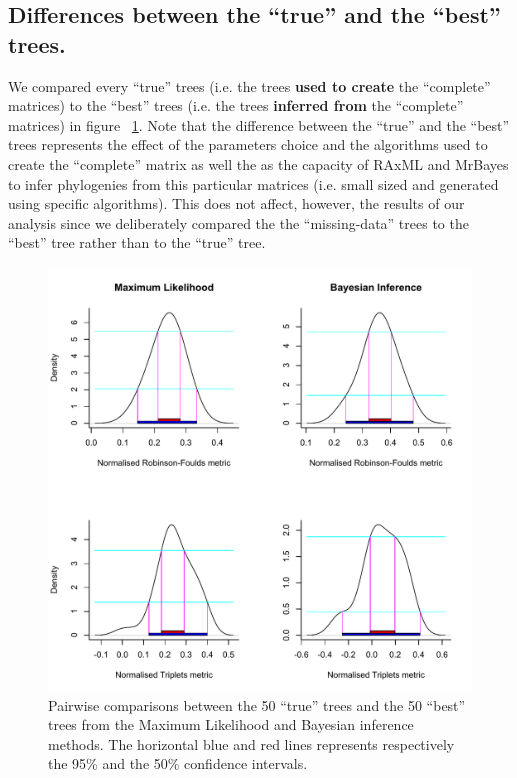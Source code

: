 \documentclass[12pt,letterpaper]{article}
\begin{document}
\subsection{Differences between the ``true'' and the ``best'' trees.}
We compared every ``true'' trees (i.e. the trees \textbf{used to create} the ``complete'' matrices) to the ``best'' trees (i.e. the trees \textbf{inferred from} the ``complete'' matrices) in figure ~\ref{Fig_Supp_True_Best}.
Note that the difference between the ``true'' and the ``best'' trees represents the effect of the parameters choice and the algorithms used to create the ``complete'' matrix as well the as the capacity of RAxML and MrBayes to infer phylogenies from this particular matrices (i.e. small sized and generated using specific algorithms).
This does not affect, however, the results of our analysis since we deliberately compared the the ``missing-data'' trees to the ``best'' tree rather than to the ``true'' tree. 

\begin{figure} 
\centering
    \includegraphics[width=1\textwidth]{SupplementaryFigures/True_vs_Best_trees.pdf}
    \caption{Pairwise comparisons between the 50 ``true'' trees and the 50 ``best'' trees from the Maximum Likelihood and Bayesian inference methods. The horizontal blue and red lines represents respectively the 95\% and the 50\% confidence intervals.} 
\label{Fig_Supp_True_Best} 
\end{figure}





\end{document}
